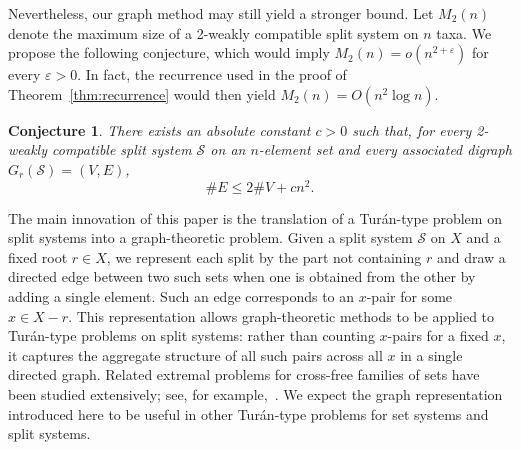 \documentclass[11pt]{article}
\newtheorem{conjecture}{Conjecture}
\newcommand{\cS}{\mathcal{S}}
\newcommand{\eps}{\varepsilon}
\begin{document}
	Nevertheless, our graph method may still yield a stronger bound. Let $M_2(n)$ denote the maximum size of a 2-weakly compatible split system on $n$ taxa. We propose the following conjecture, which would imply $M_2(n)=o(n^{2+\eps})$ for every $\eps>0$. In fact, the recurrence used in the proof of Theorem~\ref{thm:recurrence} would then yield $M_2(n)=O(n^2\log n)$.
	
	\begin{conjecture}\label{conj:quadratic-error}
		There exists an absolute constant $c>0$ such that, for every 2-weakly compatible split system $\cS$ on an $n$-element set and every associated digraph $G_r(\cS)=(V,E)$,
		\[
		\#E\le 2\#V+cn^2.
		\]
	\end{conjecture}
	
	The main innovation of this paper is the translation of a Tur\'an-type problem on split systems into a graph-theoretic problem. Given a split system $\cS$ on $X$ and a fixed root $r\in X$, we represent each split by the part not containing $r$ and draw a directed edge between two such sets when one is obtained from the other by adding a single element. Such an edge corresponds to an $x$-pair for some $x\in X-r$. This representation allows graph-theoretic methods to be applied to Tur\'an-type problems on split systems: rather than counting $x$-pairs for a fixed $x$, it captures the aggregate structure of all such pairs across all $x$ in a single directed graph. Related extremal problems for cross-free families of sets have been studied extensively; see, for example,~\cite{Fleiner2001,Pevzner1994,Suk2008,KupavskiiPachTomon2019}. We expect the graph representation introduced here to be useful in other Tur\'an-type problems for set systems and split systems.
	
\end{document}
